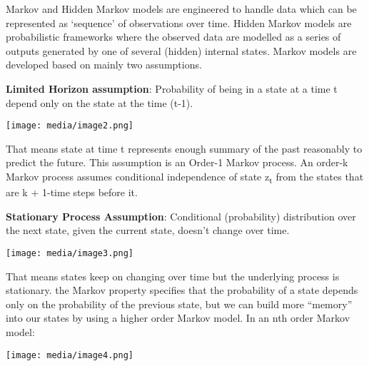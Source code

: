 \documentclass[]{article}
\begin{document}
Markov and Hidden Markov models are engineered to handle data which can
be represented as `sequence' of observations over time. Hidden Markov
models are probabilistic frameworks where the observed data are modelled
as a series of outputs generated by one of several (hidden) internal
states. Markov models are developed based on mainly two assumptions.

\textbf{Limited Horizon assumption}: Probability of being in a state at
a time t depend only on the state at the time (t-1).

\texttt{[image: media/image2.png]}

That means state at time t represents enough summary of the past
reasonably to predict the future. This assumption is an Order-1 Markov
process. An order-k Markov process assumes conditional independence of
state z\textsubscript{t} from the states that are k + 1-time steps
before it.

\textbf{Stationary Process Assumption}: Conditional (probability)
distribution over the next state, given the current state, doesn't
change over time.

\texttt{[image: media/image3.png]}

That means states keep on changing over time but the underlying process
is stationary. the Markov property specifies that the probability of a
state depends only on the probability of the previous state, but we can
build more ``memory'' into our states by using a higher order Markov
model. In an nth order Markov model:

\texttt{[image: media/image4.png]}
\end{document}
